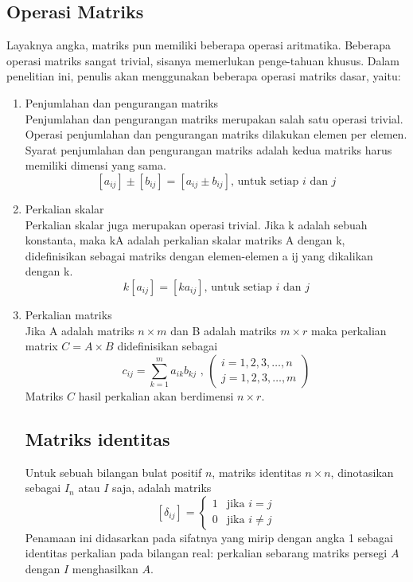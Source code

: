 \subsection{Operasi Matriks}
Layaknya angka, matriks pun memiliki beberapa operasi aritmatika. Beberapa
operasi matriks sangat trivial, sisanya memerlukan penge-tahuan khusus. Dalam
penelitian ini, penulis akan menggunakan beberapa operasi matriks dasar, yaitu:

\begin{enumerate}[label=\alph*.]

\item Penjumlahan dan pengurangan matriks\\Penjumlahan dan pengurangan matriks
merupakan salah satu operasi trivial. Operasi penjumlahan dan pengurangan
matriks dilakukan elemen per elemen. Syarat penjumlahan dan pengurangan matriks
adalah kedua matriks harus memiliki dimensi yang sama.
\begin{equation} \label{penjumlahan_matriks}
[a_{ij}] \pm [b_{ij}] = [a_{ij}\pm b_{ij}] \text{, untuk setiap }  i \text{ dan } j
\end{equation}

\item Perkalian skalar\\Perkalian skalar juga merupakan operasi trivial. Jika k adalah sebuah
konstanta, maka kA adalah perkalian skalar matriks A dengan k,
didefinisikan sebagai matriks dengan elemen-elemen a ij yang
dikalikan dengan k.
\begin{equation}
k[a_{ij}] = [ka_{ij}] \text{, untuk setiap } i \text{ dan }j
\end{equation} 

\item Perkalian matriks\\Jika A adalah matriks $n \times m$ dan B adalah matriks $m \times r$ maka
perkalian matrix $C = A \times B$ didefinisikan sebagai
\begin{equation}
	c_{ij}=\sum_{k=1}^m{a_{ik}b_{kj}}\text{ , } \left(
	\begin{array}{l}
		i=1, 2, 3, \dotsc, n\\
		j=1, 2, 3, \dotsc, m
	\end{array}\right)
\end{equation} 
Matriks $C$ hasil perkalian akan berdimensi $n\times r$.

\subsection{Matriks identitas}
Untuk sebuah bilangan bulat positif $n$, matriks identitas $n \times{n}$,
dinotasikan sebagai $I_n$ atau $I$ saja, adalah matriks 
\begin{equation}
	\left[\delta_{ij}\right]=
	\begin{cases}
		1& \text{jika $i=j$}\\
		0& \text{jika $i \neq j$}
	\end{cases}
\end{equation}
Penamaan ini didasarkan pada sifatnya yang mirip dengan angka 1
sebagai identitas perkalian pada bilangan real: perkalian sebarang
matriks persegi $A$ dengan $I$ menghasilkan $A$.


\end{enumerate}
